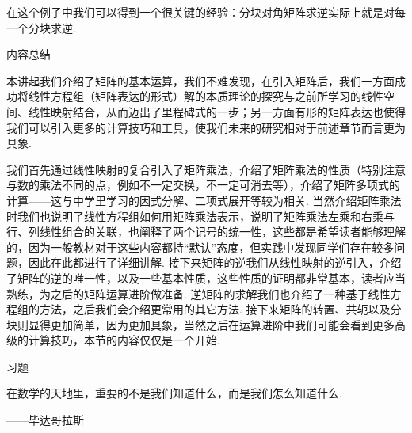 在这个例子中我们可以得到一个很关键的经验：分块对角矩阵求逆实际上就是对每一个分块求逆.

\vspace{2ex}
\centerline{\heiti \Large 内容总结}

本讲起我们介绍了矩阵的基本运算，我们不难发现，在引入矩阵后，我们一方面成功将线性方程组（矩阵表达的形式）解的本质理论的探究与之前所学习的线性空间、线性映射结合，从而迈出了里程碑式的一步；另一方面有形的矩阵表达也使得我们可以引入更多的计算技巧和工具，使我们未来的研究相对于前述章节而言更为具象.

我们首先通过线性映射的复合引入了矩阵乘法，介绍了矩阵乘法的性质（特别注意与数的乘法不同的点，例如不一定交换，不一定可消去等），介绍了矩阵多项式的计算——这与中学里学习的因式分解、二项式展开等较为相关. 当然介绍矩阵乘法时我们也说明了线性方程组如何用矩阵乘法表示，说明了矩阵乘法左乘和右乘与行、列线性组合的关联，也阐释了两个记号的统一性，这些都是希望读者能够理解的，因为一般教材对于这些内容都持``默认''态度，但实践中发现同学们存在较多问题，因此在此都进行了详细讲解. 接下来矩阵的逆我们从线性映射的逆引入，介绍了矩阵的逆的唯一性，以及一些基本性质，这些性质的证明都非常基本，读者应当熟练，为之后的矩阵运算进阶做准备. 逆矩阵的求解我们也介绍了一种基于线性方程组的方法，之后我们会介绍更常用的其它方法. 接下来矩阵的转置、共轭以及分块则显得更加简单，因为更加具象，当然之后在运算进阶中我们可能会看到更多高级的计算技巧，本节的内容仅仅是一个开始.

\vspace{2ex}
\centerline{\heiti \Large 习题}

\vspace{2ex}
{\kaishu 在数学的天地里，重要的不是我们知道什么，而是我们怎么知道什么.}
\begin{flushright}
    \kaishu
    ——毕达哥拉斯
\end{flushright}

